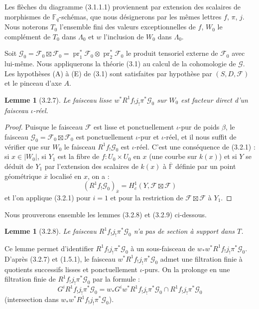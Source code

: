 \documentclass[12pt,a4paper]{article}
\theoremstyle{plain}
\newtheorem{lemma}[theorem]{Lemme}
\theoremstyle{definition}
\theoremstyle{remark}
\DeclareMathOperator{\pr}{pr}
\newcommand{\FF}{{\mathbb{F}}}
\begin{document}
Les fl\`eches du diagramme (3.1.1.1) proviennent par extension des scalaires de morphismes de $\FF_q$-sch\'emas, que nous d\'esignerons par les m\^emes lettres $f$, $\pi$, $j$. Nous noterons $T_0$ l'ensemble fini des valeurs exceptionnelles de $f$, $W_0$ le compl\'ement de $T_0$ dans $\Lambda_0$ et $w$ l'inclusion de $W_0$ dans $\Lambda_0$.

Soit $\mathscr{G}_0 = \mathscr{F}_0 \boxtimes \mathscr{F}_0 = \pr_1^*\mathscr{F}_0 \otimes \pr_2^*\mathscr{F}_0$ le produit tensoriel externe de $\mathscr{F}_0$ avec lui-m\^eme. Nous appliquerons la th\'eorie (3.1) au calcul de la cohomologie de $\mathscr{G}$. Les hypoth\`eses (A) \`a (E) de (3.1) sont satisfaites par hypoth\`ese par $(S, D, \mathscr{F})$ et le pinceau d'axe $A$.


\begin{lemma}[3.2.7]
Le faisceau lisse $w^* R^1 f_! j_! \pi^* \mathscr{G}_0$ sur $W_0$ est facteur direct d'un faisceau $\iota$-r\'eel.
\end{lemma}

\begin{proof}
Puisque le faisceau $\mathscr{F}$ est lisse et ponctuellement $\iota$-pur de poids $\beta$, le faisceau $\mathscr{G}_0 = \mathscr{F}_0 \boxtimes \mathscr{F}_0$ est ponctuellement $\iota$-pur et $\iota$-r\'eel, et il nous suffit de v\'erifier que sur $W_0$ le faisceau $R^1 f_! \mathscr{G}_0$ est $\iota$-r\'eel. C'est une cons\'equence de (3.2.1) : si $x \in |W_0|$, si $Y_1$ est la fibre de $f : U_0 \times U_0$ en $x$ (une courbe sur $k(x)$) et si $Y$ se d\'eduit de $Y_1$ par l'extension des scalaires de $k(x)$ \`a $\overline{\FF}$ d\'efinie par un point g\'eom\'etrique $\overline{x}$ localis\'e en $x$, on a :
\begin{equation}\label{eq:3.2.7.1}
(R^1 f_! \mathscr{G}_0)_{\overline{x}} = H_c^1(Y, \mathscr{F} \boxtimes \mathscr{F})
\end{equation}
et l'on applique (3.2.1) pour $i = 1$ et pour la restriction de $\mathscr{F} \boxtimes \mathscr{F}$ \`a $Y_1$.
\end{proof}

Nous prouverons ensemble les lemmes (3.2.8) et (3.2.9) ci-dessous.

\begin{lemma}[3.2.8]
Le faisceau $R^1 f_! j_! \pi^* \mathscr{G}_0$ n'a pas de section \`a support dans $T$.
\end{lemma}

Ce lemme permet d'identifier $R^1 f_! j_! \pi^* \mathscr{G}_0$ \`a un sous-faisceau de $w_* w^* R^1 f_! j_! \pi^* \mathscr{G}_0$. D'apr\`es (3.2.7) et (1.5.1), le faisceau $w^* R^1 f_! j_! \pi^* \mathscr{G}_0$ admet une filtration finie \`a quotients successifs lisses et ponctuellement $\iota$-purs. On la prolonge en une filtration finie de $R^1 f_! j_! \pi^* \mathscr{G}_0$ par la formule :
\[ G^i R^1 f_! j_! \pi^* \mathscr{G}_0 = w_* G^i w^* R^1 f_! j_! \pi^* \mathscr{G}_0 \cap R^1 f_! j_! \pi^* \mathscr{G}_0 \]
(intersection dans $w_* w^* R^1 f_! j_! \pi^* \mathscr{G}_0$).
\end{document}
